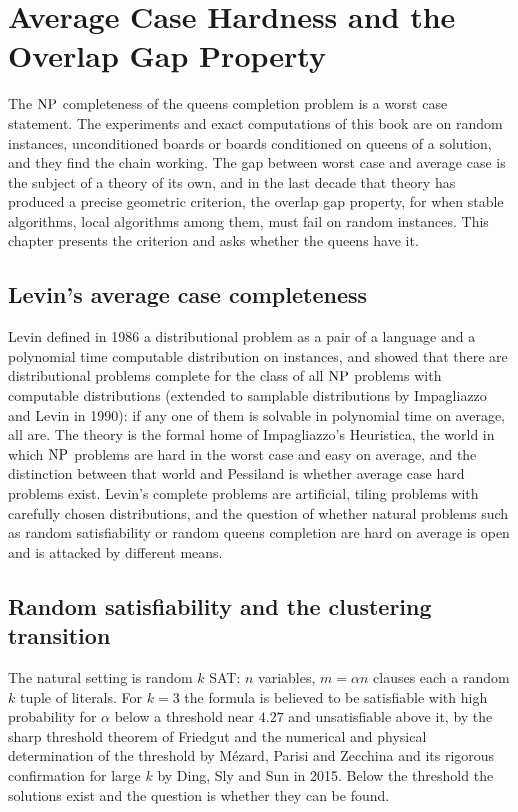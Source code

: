\chapter{Average Case Hardness and the Overlap Gap Property}
\label{ch:ogp}

The $\mathrm{NP}$ completeness of the queens completion problem is a worst case statement. The experiments and exact computations of this book are on random instances, unconditioned boards or boards conditioned on queens of a solution, and they find the chain working. The gap between worst case and average case is the subject of a theory of its own, and in the last decade that theory has produced a precise geometric criterion, the overlap gap property, for when stable algorithms, local algorithms among them, must fail on random instances. This chapter presents the criterion and asks whether the queens have it.

\section{Levin's average case completeness}

Levin defined in 1986 a distributional problem as a pair of a language and a polynomial time computable distribution on instances, and showed that there are distributional problems complete for the class of all $\mathrm{NP}$ problems with computable distributions (extended to samplable distributions by Impagliazzo and Levin in 1990): if any one of them is solvable in polynomial time on average, all are. The theory is the formal home of Impagliazzo's Heuristica, the world in which $\mathrm{NP}$ problems are hard in the worst case and easy on average, and the distinction between that world and Pessiland is whether average case hard problems exist. Levin's complete problems are artificial, tiling problems with carefully chosen distributions, and the question of whether natural problems such as random satisfiability or random queens completion are hard on average is open and is attacked by different means.

\section{Random satisfiability and the clustering transition}

The natural setting is random $k$ SAT: $n$ variables, $m = \alpha n$ clauses each a random $k$ tuple of literals. For $k = 3$ the formula is believed to be satisfiable with high probability for $\alpha$ below a threshold near $4.27$ and unsatisfiable above it, by the sharp threshold theorem of Friedgut and the numerical and physical determination of the threshold by M\'ezard, Parisi and Zecchina and its rigorous confirmation for large $k$ by Ding, Sly and Sun in 2015. Below the threshold the solutions exist and the question is whether they can be found.

